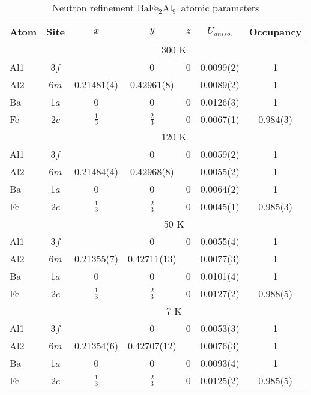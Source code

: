 \documentclass[journal=cmatex,manuscript=article]{achemso}
\newcommand{\BaFeAl}{BaFe$_2$Al$_9$}
\begin{document}
\begin{suppinfo}
\begin{table}
	\caption{Neutron refinement \BaFeAl\ atomic parameters}
	\label{tbl:NeutronRefAtoms}
	\begin{tabular}{l| c c c c c c }
		Atom &Site &$x$ &$y$ &$z$ &$U_{aniso.}$ &Occupancy\\
		\hline
		&\multicolumn{6}{c}{300 K}\\
		Al1 &3$f$ &\textonehalf &0 &0 &0.0099(2) &1\\
		Al2 &6$m$ &0.21481(4) &0.42961(8) &\textonehalf &0.0089(2) &1\\
		Ba &1$a$ &0 &0 &0 &0.0126(3) &1\\
		Fe &2$c$ &$\frac{1}{3}$ &$\frac{2}{3}$ &0 &0.0067(1) &0.984(3)\\
		\hline
		&\multicolumn{6}{c}{120 K}\\
		Al1 &3$f$ &\textonehalf &0 &0 &0.0059(2) &1\\
		Al2 &6$m$ &0.21484(4) &0.42968(8) &\textonehalf &0.0055(2) &1\\
		Ba &1$a$ &0 &0 &0 &0.0064(2) &1\\
		Fe &2$c$ &$\frac{1}{3}$ &$\frac{2}{3}$ &0 &0.0045(1) &0.985(3)\\
		\hline
		&\multicolumn{6}{c}{50 K}\\
		Al1 &3$f$ &\textonehalf &0 &0 &0.0055(4) &1\\
		Al2 &6$m$ &0.21355(7) &0.42711(13) &\textonehalf &0.0077(3) &1\\
		Ba &1$a$ &0 &0 &0 &0.0101(4) &1\\
		Fe &2$c$ &$\frac{1}{3}$ &$\frac{2}{3}$ &0 &0.0127(2) &0.988(5)\\
		\hline
		&\multicolumn{6}{c}{7 K}\\
		Al1 &3$f$ &\textonehalf &0 &0 &0.0053(3) &1\\
		Al2 &6$m$ &0.21354(6) &0.42707(12) &\textonehalf &0.0076(3) &1\\
		Ba &1$a$ &0 &0 &0 &0.0093(4) &1\\
		Fe &2$c$ &$\frac{1}{3}$ &$\frac{2}{3}$ &0 &0.0125(2) &0.985(5)\\
		
	\end{tabular}
\end{table}


\end{suppinfo}
\end{document}
